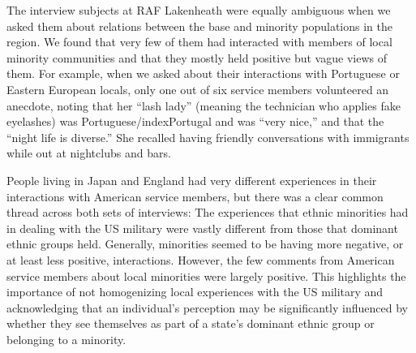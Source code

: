 The interview subjects at RAF Lakenheath were equally ambiguous when we asked them about relations between the base and minority populations in the region. We found that very few of them had interacted with members of local minority communities and that they mostly held positive but vague views of them. For example, when we asked about their interactions with Portuguese or Eastern European locals, only one out of six service members volunteered an anecdote, noting that her ``lash lady'' (meaning the technician who applies fake eyelashes) was Portuguese/index{Portugal} and was ``very nice,'' and that the ``night life is diverse.'' She recalled having friendly conversations with immigrants while out at nightclubs and bars.\cite[This individual was the youngest in the group of service members we interviewed at Lakenheath, describing herself as ``mid-20s'' and self-identified as an ethnic minority in the United States (``I'm half Filipina'').][]{raffive20190719} 

People living in Japan and England had very different experiences in their interactions with American service members, but there was a clear common thread across both sets of interviews: The experiences that ethnic minorities had in dealing with the US military were vastly different from those that dominant ethnic groups held. Generally, minorities seemed to be having more negative, or at least less positive, interactions. However, the few comments from American service members about local minorities were largely positive. This highlights the importance of not homogenizing local experiences with the US military and acknowledging that an individual's perception may be significantly influenced by whether they see themselves as part of a state's dominant ethnic group or belonging to a minority. 

